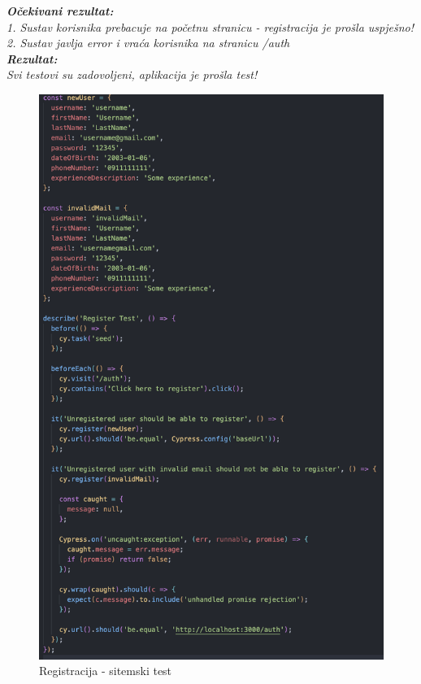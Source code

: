 			  \textbf{\textit{Očekivani rezultat:}}\\
			  \textit{1. Sustav korisnika prebacuje na početnu stranicu - registracija je prošla uspješno!}\\
			  \textit{2. Sustav javlja error i vraća korisnika na stranicu /auth}\\
 
			  \textbf{\textit{Rezultat:}}\\
			  \textit{Svi testovi su zadovoljeni, aplikacija je prošla test!}\\
\begin{figure}[H]
			\includegraphics[scale=0.5]{slike/test2.PNG} %
			\centering
			\caption{Registracija - sitemski test}
			\label{fig:rez2}
			\end{figure}


